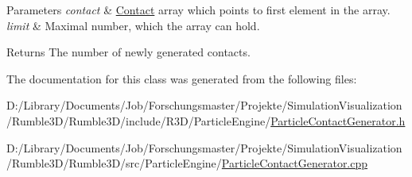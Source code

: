 \begin{DoxyParams}{Parameters}
{\em contact} & \mbox{\hyperlink{classr3_1_1_contact}{Contact}} array which points to first element in the array. \\
\hline
{\em limit} & Maximal number, which the array can hold. \\
\hline
\end{DoxyParams}
\begin{DoxyReturn}{Returns}
The number of newly generated contacts. 
\end{DoxyReturn}


The documentation for this class was generated from the following files\+:\begin{DoxyCompactItemize}
\item 
D\+:/\+Library/\+Documents/\+Job/\+Forschungsmaster/\+Projekte/\+Simulation\+Visualization/\+Rumble3\+D/\+Rumble3\+D/include/\+R3\+D/\+Particle\+Engine/\mbox{\hyperlink{_particle_contact_generator_8h}{Particle\+Contact\+Generator.\+h}}\item 
D\+:/\+Library/\+Documents/\+Job/\+Forschungsmaster/\+Projekte/\+Simulation\+Visualization/\+Rumble3\+D/\+Rumble3\+D/src/\+Particle\+Engine/\mbox{\hyperlink{_particle_contact_generator_8cpp}{Particle\+Contact\+Generator.\+cpp}}\end{DoxyCompactItemize}
